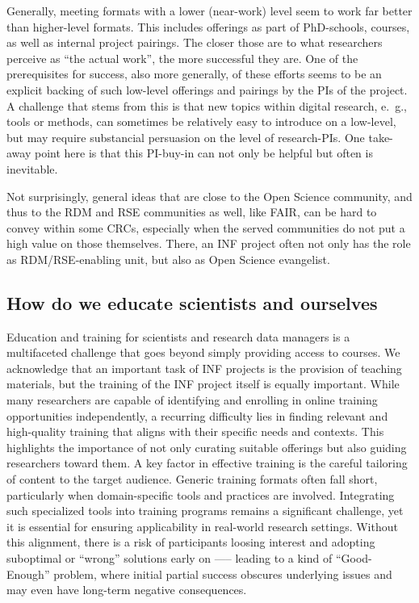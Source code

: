 \documentclass{eceasst}
\begin{document}
Generally, meeting formats with a lower (near-work) level seem to work far better than higher-level formats.
This includes offerings as part of PhD-schools, courses, as well as internal project pairings.
The closer those are to what researchers perceive as “the actual work”, the more successful they are.
One of the prerequisites for success, also more generally, of these efforts seems to be an explicit backing of such low-level offerings and pairings by the PIs of the project.
A challenge that stems from this is that new topics within digital research, e. g., tools or methods, can sometimes be relatively easy to introduce on a low-level, but may require substancial persuasion on the level of research-PIs.
One take-away point here is that this PI-buy-in can not only be helpful but often is inevitable.

Not surprisingly, general ideas that are close to the Open Science community, and thus to the RDM and RSE communities as well, like FAIR, can be hard to convey within some CRCs, especially when the served communities do not put a high value on those themselves.
There, an INF project often not only has the role as RDM/RSE-enabling unit, but also as Open Science evangelist.

\subsection{How do we educate scientists and ourselves}
Education and training for scientists and research data managers is a multifaceted challenge that goes beyond simply providing access to courses.
We acknowledge that an important task of INF projects is the provision of teaching materials, but the training of the INF project itself is equally important.
While many researchers are capable of identifying and enrolling in online training opportunities independently, a recurring difficulty lies in finding relevant and high-quality training that aligns with their specific needs and contexts.
This highlights the importance of not only curating suitable offerings but also guiding researchers toward them.
A key factor in effective training is the careful tailoring of content to the target audience.
Generic training formats often fall short, particularly when domain-specific tools and practices are involved.
Integrating such specialized tools into training programs remains a significant challenge, yet it is essential for ensuring applicability in real-world research settings.
Without this alignment, there is a risk of participants loosing interest and adopting suboptimal or “wrong” solutions early on —-- leading to a kind of ``Good-Enough'' problem, where initial partial success obscures underlying issues and may even have long-term negative consequences.
\end{document}
